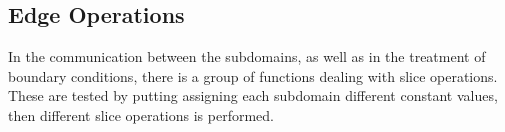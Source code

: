 \subsection{Edge Operations}
  In the communication between the subdomains, as well as in the treatment of
  boundary conditions, there is a group of functions dealing with slice operations.
  These are tested by putting assigning each subdomain different constant values,
  then different slice operations is performed.
